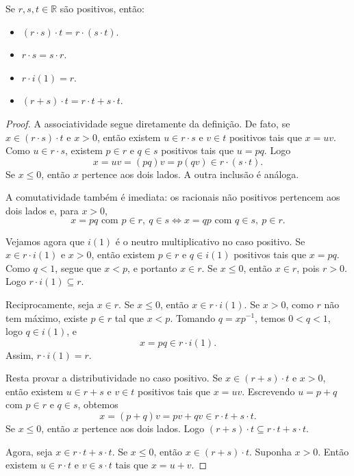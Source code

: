 \begin{proposition}
    Se $r, s, t \in \mathbb R$ são positivos, então:
    \begin{itemize}
        \item $(r\cdot s)\cdot t = r\cdot(s\cdot t)$.
        \item $r\cdot s = s\cdot r$.
        \item $r\cdot i(1) = r$.
        \item $(r+s)\cdot t = r\cdot t + s\cdot t$.
    \end{itemize}
\end{proposition}
\begin{proof}
    A associatividade segue diretamente da definição.
    De fato, se $x\in (r\cdot s)\cdot t$ e $x>0$, então existem $u\in r\cdot s$ e $v\in t$ positivos tais que $x=uv$.
    Como $u\in r\cdot s$, existem $p\in r$ e $q\in s$ positivos tais que $u=pq$.
    Logo
    \[
        x=uv=(pq)v=p(qv)\in r\cdot(s\cdot t).
    \]
    Se $x\leq 0$, então $x$ pertence aos dois lados.
    A outra inclusão é análoga.

    A comutatividade também é imediata: os racionais não positivos pertencem aos dois lados e, para $x>0$,
    \[
        x=pq \text{ com } p\in r,\ q\in s \iff x=qp \text{ com } q\in s,\ p\in r.
    \]

    Vejamos agora que $i(1)$ é o neutro multiplicativo no caso positivo.
    Se $x\in r\cdot i(1)$ e $x>0$, então existem $p\in r$ e $q\in i(1)$ positivos tais que $x=pq$.
    Como $q<1$, segue que $x<p$, e portanto $x\in r$.
    Se $x\leq 0$, então $x\in r$, pois $r>0$.
    Logo $r\cdot i(1)\subseteq r$.

    Reciprocamente, seja $x\in r$.
    Se $x\leq 0$, então $x\in r\cdot i(1)$.
    Se $x>0$, como $r$ não tem máximo, existe $p\in r$ tal que $x<p$.
    Tomando $q=xp^{-1}$, temos $0<q<1$, logo $q\in i(1)$, e
    \[
        x=pq\in r\cdot i(1).
    \]
    Assim, $r\cdot i(1)=r$.

    Resta provar a distributividade no caso positivo.
    Se $x\in (r+s)\cdot t$ e $x>0$, então existem $u\in r+s$ e $v\in t$ positivos tais que $x=uv$.
    Escrevendo $u=p+q$ com $p\in r$ e $q\in s$, obtemos
    \[
        x=(p+q)v=pv+qv\in r\cdot t+s\cdot t.
    \]
    Se $x\leq 0$, então $x$ pertence aos dois lados.
    Logo $(r+s)\cdot t\subseteq r\cdot t+s\cdot t$.

    Agora, seja $x\in r\cdot t+s\cdot t$.
    Se $x\leq 0$, então $x\in (r+s)\cdot t$.
    Suponha $x>0$.
    Então existem $u\in r\cdot t$ e $v\in s\cdot t$ tais que $x=u+v$.


\end{proof}
